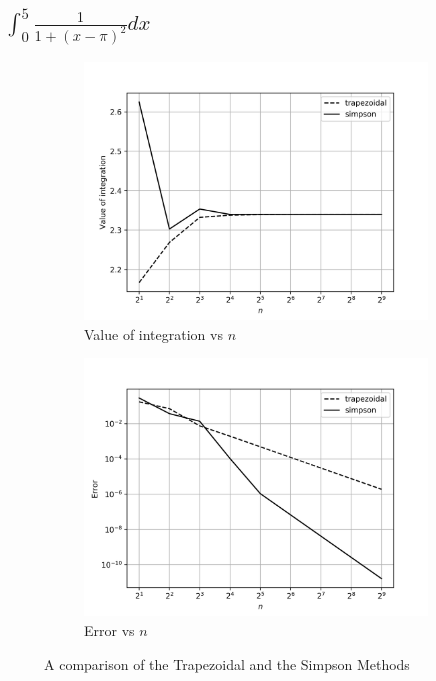 \documentclass[12,a4paper]{article}
\begin{document}
    \subsection{$\int_0^5 \frac{1}{1 + (x - \pi)^2} dx$}
    \begin{figure}[h!]
        \centering
        \begin{subfigure}[t]{0.49\textwidth}
            \includegraphics[width=\textwidth]{plots/q1e.png}
            \caption{Value of integration vs $n$}
            \label{fig:sq3a}
        \end{subfigure}
        \begin{subfigure}[t]{0.49\textwidth}
            \includegraphics[width=\textwidth]{plots/q1f.png}
            \caption{Error vs $n$}
            \label{fig:q3b}
        \end{subfigure}
        \caption{A comparison of the Trapezoidal and the Simpson Methods}
    \end{figure}
    
\end{document}
